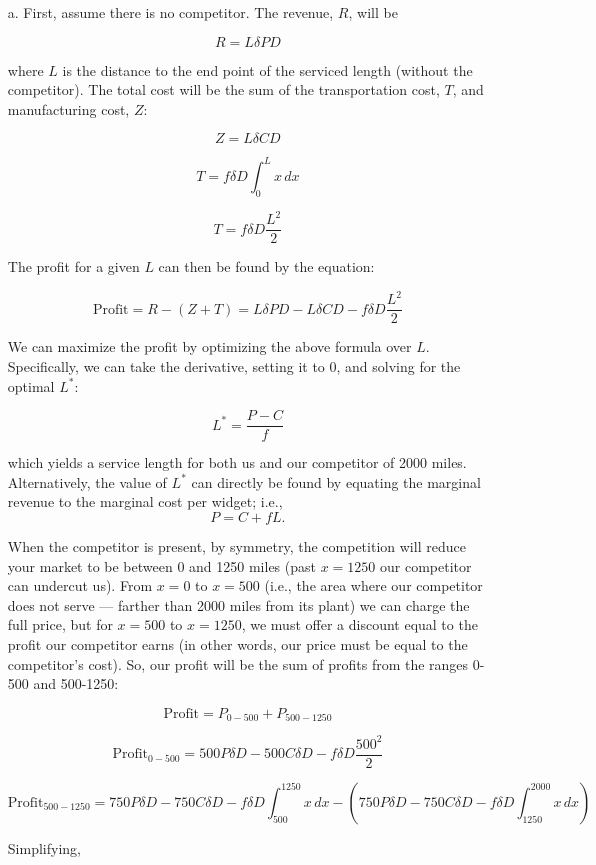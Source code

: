 \documentclass[12pt]{article}
\begin{document}
\begin{itemize}
    \item [a.] First, assume there is no competitor. The revenue, \(R\), will be

\[
R = L\delta PD
\]

where \(L\) is the distance to the end point of the serviced length (without the competitor). 
The total cost will be the sum of the transportation cost, \(T\), and manufacturing cost, \(Z\):

\[
Z = L\delta CD
\]

\[
T = f \delta D \int_0^L x \, dx
\]

\[
T = f\delta D \frac{L^2}{2}
\]

The profit for a given \(L\) can then be found by the equation:

\[
\text{Profit} = R - (Z + T)= L\delta PD - L\delta CD -  f\delta D \frac{L^2}{2}
\]

We can maximize the profit by optimizing the above formula over $L$. Specifically, we can take the derivative, setting it to 0, and solving for the optimal \(L^*\):

\[
L^* = \frac{P - C}{f}
\]

which yields a service length for both us and our competitor of 2000 miles. Alternatively, the value of $L^*$ can directly be found by equating the marginal revenue to the marginal cost per widget; i.e., 
$$ P = C+fL.$$

When the competitor is present, by symmetry, the competition will reduce your market to be between 0 and 1250 miles (past \(x = 1250\) our competitor can undercut us). From \(x = 0\) to \(x = 500\) (i.e., the area where our competitor does not serve --- farther than 2000 miles from its plant) we can charge the full price, but for \(x = 500\) to \(x = 1250\), we must offer a discount equal to the profit our competitor earns (in other words, our price must be equal to the competitor's cost). So, our profit will be the sum of profits from the ranges 0-500 and 500-1250:

\[
\text{Profit} = P_{0-500} + P_{500-1250}
\]

\[
\text{Profit}_{0-500} = 500P\delta D - 500C\delta D - f \delta D \frac{500^2}{2}
\]

\[
\text{Profit}_{500-1250} = 750P \delta D - 750C \delta D - f\delta D \int_{500}^{1250} x \, dx - \left( 750P\delta D - 750C\delta D - f\delta D \int_{1250}^{2000} x \, dx \right) 
\]

Simplifying,


\end{itemize}
\end{document}
